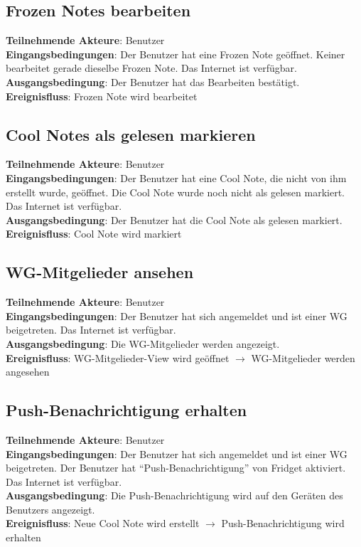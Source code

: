 \documentclass[a4paper]{scrreprt}
\begin{document}
        	\subsection{Frozen Notes bearbeiten}
        	\textbf{Teilnehmende Akteure}: Benutzer \\
        	\textbf{Eingangsbedingungen}: Der Benutzer hat eine Frozen Note geöffnet. Keiner bearbeitet gerade dieselbe Frozen Note. Das Internet ist verfügbar. \\
        	\textbf{Ausgangsbedingung}: Der Benutzer hat das Bearbeiten bestätigt. \\
        	\textbf{Ereignisfluss}: Frozen Note wird bearbeitet
        	
        	\subsection{Cool Notes als gelesen markieren}
        	\textbf{Teilnehmende Akteure}: Benutzer \\
        	\textbf{Eingangsbedingungen}: Der Benutzer hat eine Cool Note, die nicht von ihm erstellt wurde, geöffnet. Die Cool Note wurde noch nicht als gelesen markiert. Das Internet ist verfügbar. \\
        	\textbf{Ausgangsbedingung}: Der Benutzer hat die Cool Note als gelesen markiert. \\
        	\textbf{Ereignisfluss}: Cool Note wird markiert
        	
        	\subsection{WG-Mitgelieder ansehen}
        	\textbf{Teilnehmende Akteure}: Benutzer \\
        	\textbf{Eingangsbedingungen}: Der Benutzer hat sich angemeldet und ist einer WG beigetreten. Das Internet ist verfügbar. \\
        	\textbf{Ausgangsbedingung}: Die WG-Mitgelieder werden angezeigt. \\
        	\textbf{Ereignisfluss}: WG-Mitgelieder-View wird geöffnet $\rightarrow$ WG-Mitgelieder werden angesehen
        	
        	\subsection{Push-Benachrichtigung erhalten}
        	\textbf{Teilnehmende Akteure}: Benutzer \\
        	\textbf{Eingangsbedingungen}: Der Benutzer hat sich angemeldet und ist einer WG beigetreten. Der Benutzer hat ``Push-Benachrichtigung'' von Fridget aktiviert. Das Internet ist verfügbar. \\
        	\textbf{Ausgangsbedingung}: Die Push-Benachrichtigung wird auf den Geräten des Benutzers angezeigt. \\
        	\textbf{Ereignisfluss}: Neue Cool Note wird erstellt $\rightarrow$ Push-Benachrichtigung wird erhalten
        	
\end{document}
